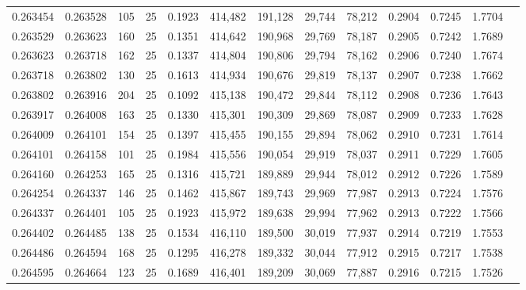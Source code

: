 \begin{tabular}{rrrrrrrrrrrrr}
0.263454 & 0.263528 &   105 &  25 &                                     0.1923 & 414,482 & 191,128 &  29,744 &  78,212 & 0.2904 & 0.7245 & 1.7704 \\
0.263529 & 0.263623 &   160 &  25 &                                     0.1351 & 414,642 & 190,968 &  29,769 &  78,187 & 0.2905 & 0.7242 & 1.7689 \\
0.263623 & 0.263718 &   162 &  25 &                                     0.1337 & 414,804 & 190,806 &  29,794 &  78,162 & 0.2906 & 0.7240 & 1.7674 \\
0.263718 & 0.263802 &   130 &  25 &                                     0.1613 & 414,934 & 190,676 &  29,819 &  78,137 & 0.2907 & 0.7238 & 1.7662 \\
0.263802 & 0.263916 &   204 &  25 &                                     0.1092 & 415,138 & 190,472 &  29,844 &  78,112 & 0.2908 & 0.7236 & 1.7643 \\
0.263917 & 0.264008 &   163 &  25 &                                     0.1330 & 415,301 & 190,309 &  29,869 &  78,087 & 0.2909 & 0.7233 & 1.7628 \\
0.264009 & 0.264101 &   154 &  25 &                                     0.1397 & 415,455 & 190,155 &  29,894 &  78,062 & 0.2910 & 0.7231 & 1.7614 \\
0.264101 & 0.264158 &   101 &  25 &                                     0.1984 & 415,556 & 190,054 &  29,919 &  78,037 & 0.2911 & 0.7229 & 1.7605 \\
0.264160 & 0.264253 &   165 &  25 &                                     0.1316 & 415,721 & 189,889 &  29,944 &  78,012 & 0.2912 & 0.7226 & 1.7589 \\
0.264254 & 0.264337 &   146 &  25 &                                     0.1462 & 415,867 & 189,743 &  29,969 &  77,987 & 0.2913 & 0.7224 & 1.7576 \\
0.264337 & 0.264401 &   105 &  25 &                                     0.1923 & 415,972 & 189,638 &  29,994 &  77,962 & 0.2913 & 0.7222 & 1.7566 \\
0.264402 & 0.264485 &   138 &  25 &                                     0.1534 & 416,110 & 189,500 &  30,019 &  77,937 & 0.2914 & 0.7219 & 1.7553 \\
0.264486 & 0.264594 &   168 &  25 &                                     0.1295 & 416,278 & 189,332 &  30,044 &  77,912 & 0.2915 & 0.7217 & 1.7538 \\
0.264595 & 0.264664 &   123 &  25 &                                     0.1689 & 416,401 & 189,209 &  30,069 &  77,887 & 0.2916 & 0.7215 & 1.7526 \\

\end{tabular}
